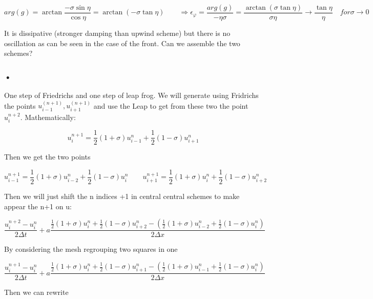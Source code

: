 \begin{equation}
arg(g) = \arctan \frac{-\sigma \sin \eta}{\cos \eta} = \arctan (-\sigma \tan \eta) \qquad \Rightarrow \epsilon _\varphi = \frac{arg(g)}{-\eta \sigma} = \frac{\arctan (\sigma \tan \eta)}{\sigma \eta} \rightarrow \frac{\tan \eta}{\eta} \quad for \sigma \rightarrow 0
\end{equation}

It is dissipative (stronger damping than upwind scheme) but there is no oscillation as can be seen in the case of the front. Can we assemble the two schemes? 

\subsubsection{•}
One step of Friedrichs and one step of leap frog. We will generate using Fridrichs the points $u^(n+1)_{i-1}, u^(n+1)_{i+1}$ and use the Leap to get from these two the point $u_{i}^{n+2}$. Mathematically: 

\begin{equation}
u_i^{n+1} = \frac{1}{2}(1+\sigma )u_{i-1}^n + \frac{1}{2}(1-\sigma) u_{i+1}^n
\end{equation}

Then we get the two points 

\begin{equation}
u_{i-1}^{n+1} = \frac{1}{2}(1+\sigma )u_{i-2}^n + \frac{1}{2}(1-\sigma) u_{i}^n\qquad 
u_{i+1}^{n+1} = \frac{1}{2}(1+\sigma )u_{i}^n + \frac{1}{2}(1-\sigma) u_{i+2}^n
\end{equation}

Then we will just shift the n indices +1 in central central schemes to make appear the n+1 on u: 

\begin{equation}
\frac{u_i^{n+2} - u_i^n}{2\Delta t} + a \frac{\frac{1}{2}(1+\sigma)u_i^{n} + \frac{1}{2}(1-\sigma)u_{i+2}^n-\left(\frac{1}{2}(1+\sigma)u_{i-2}^n + \frac{1}{2}(1-\sigma)u_i^n \right)}{2\Delta x}
\end{equation}

By considering the mesh regrouping two squares in one

\begin{equation}
\frac{u_i^{n+1} - u_i^n}{2\Delta t} + a \frac{\frac{1}{2}(1+\sigma)u_i^{n} + \frac{1}{2}(1-\sigma)u_{i+1}^n-\left(\frac{1}{2}(1+\sigma)u_{i-1}^n + \frac{1}{2}(1-\sigma)u_i^n \right)}{2\Delta x}
\end{equation}

Then we can rewrite

